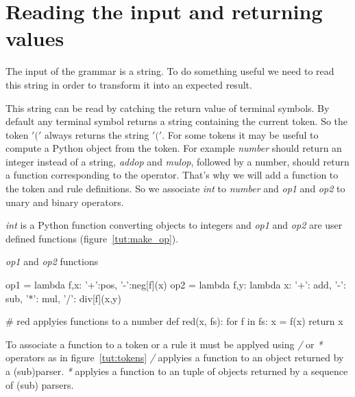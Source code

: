 \section{Reading the input and returning values}

The input of the grammar is a string. To do something useful we need to read this string in order to transform it into an expected result.

This string can be read by catching the return value of terminal symbols. By default any terminal symbol returns a string containing the current token. So the token $'('$ always returns the string $'('$. For some tokens it may be useful to compute a Python object from the token. For example \emph{number} should return an integer instead of a string, \emph{addop} and \emph{mulop}, followed by a number, should return a function corresponding to the operator. That's why we will add a function to the token and rule definitions. So we associate \emph{int} to \emph{number} and \emph{op1} and \emph{op2} to unary and binary operators.

\emph{int} is a Python function converting objects to integers and \emph{op1} and \emph{op2} are user defined functions (figure~\ref{tut:make_op}).

\begin{code}
\caption{\emph{op1} and \emph{op2} functions}                          \label{tut:make_op}
\begin{verbatimtab}[4]
    op1 = lambda f,x: {'+':pos, '-':neg}[f](x)
    op2 = lambda f,y: lambda x: {'+': add, '-': sub, '*': mul, '/': div}[f](x,y)

    # red applyies functions to a number
    def red(x, fs):
        for f in fs: x = f(x)
        return x
\end{verbatimtab}
\end{code}

To associate a function to a token or a rule it must be applyed using \emph{/} or \emph{*} operators as in figure~\ref{tut:tokens}
\emph{/} applyies a function to an object returned by a (sub)parser.
\emph{*} applyies a function to an tuple of objects returned by a sequence of (sub) parsers.

